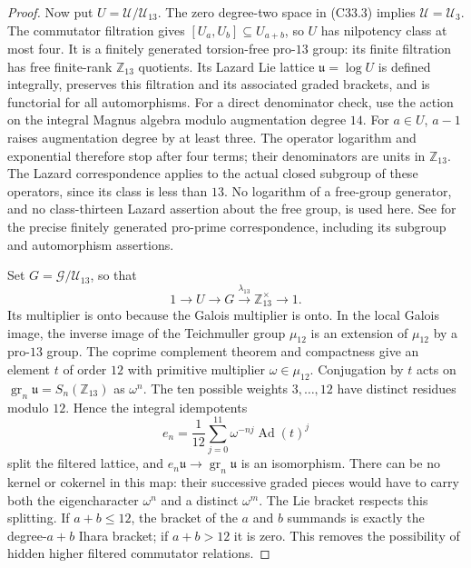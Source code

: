 \begin{proof}
Now put $U=\mathcal U/\mathcal U_{13}$.
The zero degree-two space in (C33.3) implies
$\mathcal U=\mathcal U_3$.  The commutator filtration gives
$[U_a,U_b]\subseteq U_{a+b}$, so $U$ has nilpotency class at most
four.  It is a finitely generated torsion-free pro-$13$ group:
its finite filtration has free finite-rank $\mathbb Z_{13}$
quotients.  Its Lazard Lie lattice
$\mathfrak u=\log U$ is defined integrally, preserves this
filtration and its associated graded brackets, and is functorial
for all automorphisms.
For a direct denominator check, use the action on the integral
Magnus algebra modulo augmentation degree $14$.
For $a\in U$, $a-1$ raises augmentation degree by at least three.
The operator logarithm and exponential therefore stop after
four terms; their denominators are units in $\mathbb Z_{13}$.
The Lazard correspondence applies to the actual closed subgroup
of these operators, since its class is less than $13$.
No logarithm of a free-group generator, and no class-thirteen
Lazard assertion about the free group, is used here.
See \cite[Theorem 1]{PBC_Garaialde2014} for the precise
finitely generated pro-prime correspondence, including its
subgroup and automorphism assertions.

Set $G=\mathcal G/\mathcal U_{13}$, so that
\[
       1\longrightarrow U\longrightarrow G
        \xrightarrow{\lambda_{13}}\mathbb Z_{13}^{\times}
        \longrightarrow1 .                                    \tag{C33.5}
\]
Its multiplier is onto because the Galois multiplier is onto.
In the local Galois image, the inverse image of the Teichmuller
group $\mu_{12}$ is an extension of $\mu_{12}$ by a pro-$13$
group.  The coprime complement theorem and compactness give an
element $t$ of order $12$ with primitive multiplier
$\omega\in\mu_{12}$.
Conjugation by $t$ acts on
$\operatorname{gr}_n\mathfrak u=S_n(\mathbb Z_{13})$
as $\omega^n$.  The ten possible weights $3,\ldots,12$
have distinct residues modulo $12$.  Hence the integral
idempotents
\[
 e_n=\frac1{12}\sum_{j=0}^{11}\omega^{-nj}\operatorname{Ad}(t)^j
\]
split the filtered lattice, and
$e_n\mathfrak u\to\operatorname{gr}_n\mathfrak u$ is an
isomorphism.  There can be no kernel or cokernel in this map:
their successive graded pieces would have to carry both
the eigencharacter $\omega^n$ and a distinct $\omega^m$.
The Lie bracket respects this splitting.  If $a+b\leq12$,
the bracket of the $a$ and $b$ summands is exactly the
degree-$a+b$ Ihara bracket; if $a+b>12$ it is zero.
This removes the possibility of hidden higher filtered
commutator relations.


\end{proof}
